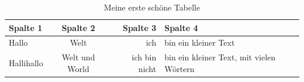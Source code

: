 \documentclass[12pt,parskip=half]{scrartcl}
\begin{document}
\begin{table}
\caption{Meine erste schöne Tabelle}\label{tab:erste}
\begin{tabular}{lcrp{5cm}} \toprule
\textbf{Spalte 1} & \textbf{Spalte 2} & \textbf{Spalte  3} & \textbf{Spalte  4} \\ \midrule
Hallo & Welt & ich & bin ein kleiner Text \\ 
Hallihallo & Welt und World & ich bin nicht & bin ein kleiner Text, mit vielen Wörtern \\ \bottomrule
\end{tabular}
\end{table}
\end{document}
